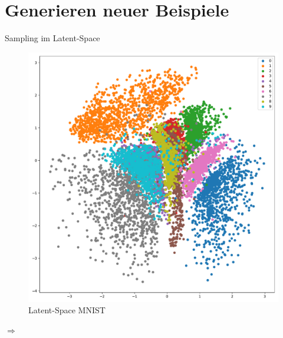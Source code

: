 \documentclass[10pt, compress]{beamer}
\begin{document}
\section{Generieren neuer Beispiele}
\begin{frame}{Sampling im Latent-Space}
\begin{minipage}[c]{.39\textwidth}
\vspace*{1.1cm}
  \begin{figure}[hbt]
    \includegraphics[width=\textwidth]{gfx/evaluation/feature_space/distributions_mnist}
    \caption{Latent-Space MNIST}
  \end{figure}
\end{minipage}
\hfill
$\Rightarrow$
\hfill
\begin{minipage}[c]{.5\textwidth}
  \begin{figure}[hbt]

\end{figure}
\end{minipage}
\end{frame}
\end{document}
